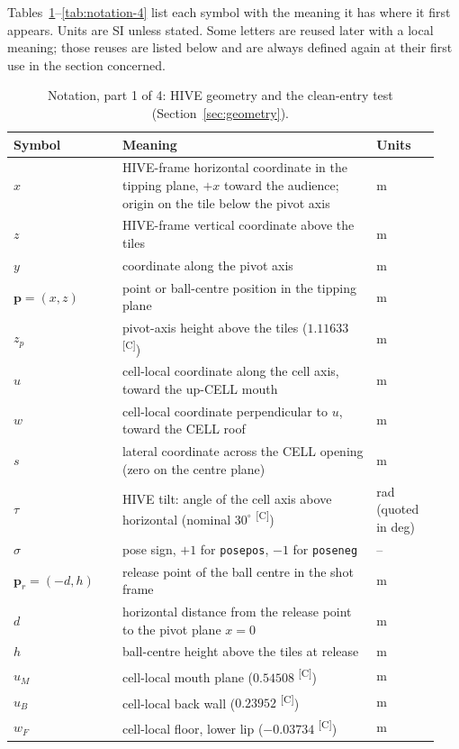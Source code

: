\documentclass[11pt]{article}
\makeatletter
\DeclareRobustCommand{\provtag}[1]{%
  \ifmmode\text{\provtag@text{#1}}\else\provtag@text{#1}\fi}
\newcommand{\provtag@text}[1]{%
  \textsuperscript{\textsf{\upshape\scriptsize\color@grey[#1]}}}
\newcommand{\color@grey}[1]{#1}
\newcommand{\color@grey}[1]{\pdfliteral{0.45 g}#1\pdfliteral{0 g}}
\DeclareRobustCommand{\confirmed}{\provtag{C}}
\newcommand{\vect}[1]{\bm{#1}}
\DeclareRobustCommand{\code}[1]{{\def\_{\textunderscore\allowbreak}\texttt{#1}}}
\makeatother
\begin{document}
Tables~\ref{tab:notation-1}--\ref{tab:notation-4} list each symbol with the meaning it
has where it first appears. Units are SI unless stated. Some letters are reused later with a local
meaning; those reuses are listed below and are always defined again at their first use in the
section concerned.

\begin{table}[p]
\centering
\small
\caption{Notation, part 1 of 4: HIVE geometry and the clean-entry test (Section~\ref{sec:geometry}).}
\label{tab:notation-1}
\begin{tabular}{@{}p{0.24\linewidth}p{0.56\linewidth}p{0.14\linewidth}@{}}
  \toprule
  Symbol & Meaning & Units \\
  \midrule
  $x$ & HIVE-frame horizontal coordinate in the tipping plane, $+x$ toward the audience; origin on the tile below the pivot axis & m \\
  $z$ & HIVE-frame vertical coordinate above the tiles & m \\
  $y$ & coordinate along the pivot axis & m \\
  $\vect{p}=(x,z)$ & point or ball-centre position in the tipping plane & m \\
  $z_p$ & pivot-axis height above the tiles ($1.11633$\confirmed) & m \\
  $u$ & cell-local coordinate along the cell axis, toward the up-CELL mouth & m \\
  $w$ & cell-local coordinate perpendicular to $u$, toward the CELL roof & m \\
  $s$ & lateral coordinate across the CELL opening (zero on the centre plane) & m \\
  $\tau$ & HIVE tilt: angle of the cell axis above horizontal (nominal $30^\circ$\confirmed) & rad (quoted in deg) \\
  $\sigma$ & pose sign, $+1$ for \code{pose\_pos}, $-1$ for \code{pose\_neg} & -- \\
  $\vect{p}_r=(-d,h)$ & release point of the ball centre in the shot frame & m \\
  $d$ & horizontal distance from the release point to the pivot plane $x=0$ & m \\
  $h$ & ball-centre height above the tiles at release & m \\
  $u_M$ & cell-local mouth plane ($0.54508$\confirmed) & m \\
  $u_B$ & cell-local back wall ($0.23952$\confirmed) & m \\
  $w_F$ & cell-local floor, lower lip ($-0.03734$\confirmed) & m \\

\end{tabular}
\end{table}
\end{document}
